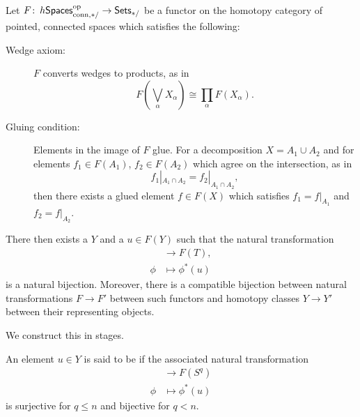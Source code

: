 \begin{theorem}[Brown]\label{BrownRepThm}
Let $F\colon\thinspace h\mathsf{Spaces}^{\mathrm{op}}_{\mathrm{conn}, */} \to \mathsf{Sets}_{*/}$ be a functor on the homotopy category of pointed, connected spaces which satisfies the following:
\begin{description}
    \item[Wedge axiom:] $F$ converts wedges to products, as in \[F\left(\bigvee_\alpha X_\alpha\right) \cong \prod_\alpha F(X_\alpha).\]
    \item[Gluing condition:] Elements in the image of $F$ glue.
    For a decomposition $X = A_1 \cup A_2$ and for elements $f_1 \in F(A_1)$, $f_2 \in F(A_2)$ which agree on the intersection, as in \[f_1|_{A_1 \cap A_2} = f_2|_{A_1 \cap A_2},\] then there exists a glued element $f \in F(X)$ which satisfies $f_1 = f|_{A_1}$ and $f_2 = f|_{A_2}$.
\end{description}
There then exists a  $Y$ and a  $u \in F(Y)$ such that the natural transformation
\begin{align*}
[T, Y] & \to F(T), \\
\phi & \mapsto \phi^*(u)
\end{align*}
is a natural bijection.
Moreover, there is a compatible bijection between natural transformations $F \to F'$ between such functors and homotopy classes $Y \to Y'$ between their representing objects.
\end{theorem}

\noindent We construct this in stages.

\begin{definition}
An element $u \in Y$ is said to be  if the associated natural transformation
\begin{align*}
[S^q, Y] & \to F(S^q) \\
\phi & \mapsto \phi^*(u)
\end{align*}
is surjective for $q \le n$ and bijective for $q < n$.
\end{definition}

